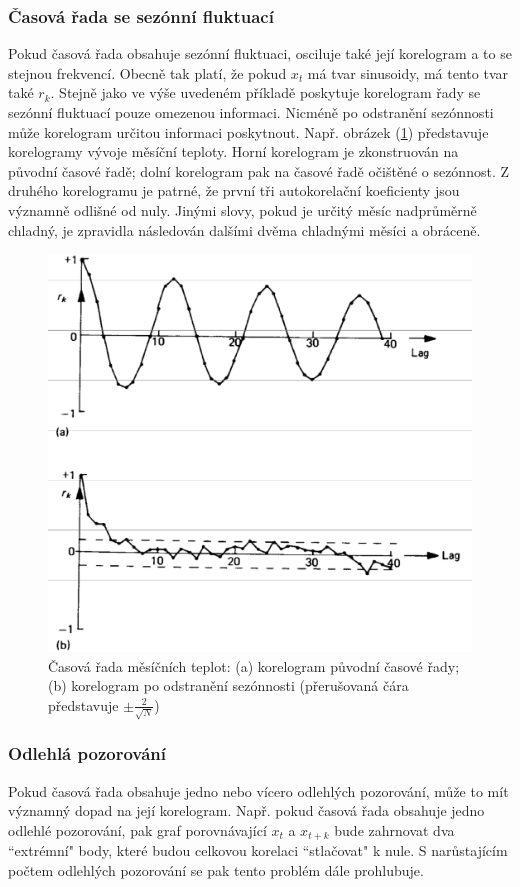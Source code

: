 \subsubsection{Časová řada se sezónní fluktuací}

Pokud časová řada obsahuje sezónní fluktuaci, osciluje také její korelogram a to se stejnou frekvencí. Obecně tak platí, že pokud $x_t$ má tvar sinusoidy, má tento tvar také $r_k$. Stejně jako ve výše uvedeném příkladě poskytuje korelogram řady se sezónní fluktuací pouze omezenou informaci. Nicméně po odstranění sezónnosti může korelogram určitou informaci poskytnout. Např. obrázek (\ref{figure_2_4}) představuje korelogramy vývoje měsíční teploty. Horní korelogram je zkonstruován na původní časové řadě; dolní korelogram pak na časové řadě očištěné o sezónnost. Z druhého korelogramu je patrné, že první tři autokorelační koeficienty jsou významně odlišné od nuly. Jinými slovy, pokud je určitý měsíc nadprůměrně chladný, je zpravidla následován dalšími dvěma chladnými měsíci a obráceně.

\begin{figure}[htp]
\centering
\includegraphics[scale = 0.40]{pictures/figure_2_4.eps}
\caption{Časová řada měsíčních teplot: (a) korelogram původní časové řady; (b) korelogram po odstranění sezónnosti (přerušovaná čára představuje $\pm \frac{2}{\sqrt{N}}$)}
\label{figure_2_4}
\end{figure}

\subsubsection{Odlehlá pozorování}

Pokud časová řada obsahuje jedno nebo vícero odlehlých pozorování, může to mít významný dopad na její korelogram. Např. pokud časová řada obsahuje jedno odlehlé pozorování, pak graf porovnávající $x_t$ a $x_{t + k}$ bude zahrnovat dva ``extrémní" body, které budou celkovou korelaci ``stlačovat" k nule. S narůstajícím počtem odlehlých pozorování se pak tento problém dále prohlubuje.